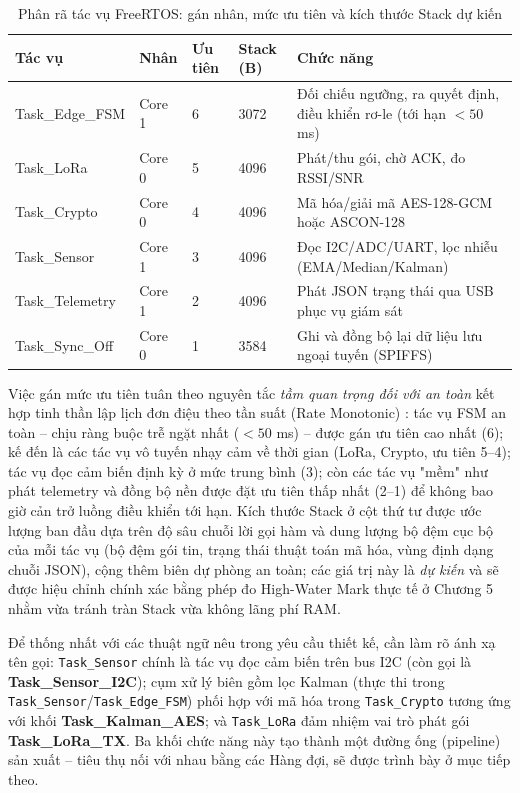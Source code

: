 \begin{table}[H]
\centering
\caption{Phân rã tác vụ FreeRTOS: gán nhân, mức ưu tiên và kích thước Stack dự kiến}
\label{Bảng 3.4}
\renewcommand{\arraystretch}{1.4}
\small
\begin{tabular}{p{2.8cm} p{1.1cm} p{1.3cm} p{1.7cm} p{6.2cm}}
\hline
\textbf{Tác vụ} & \textbf{Nhân} & \textbf{Ưu tiên} & \textbf{Stack (B)} & \textbf{Chức năng} \\ \hline
Task\_Edge\_FSM & Core 1 & 6 & 3072 & Đối chiếu ngưỡng, ra quyết định, điều khiển rơ-le (tới hạn $<50$ ms) \\ 
Task\_LoRa & Core 0 & 5 & 4096 & Phát/thu gói, chờ ACK, đo RSSI/SNR \\ 
Task\_Crypto & Core 0 & 4 & 4096 & Mã hóa/giải mã AES-128-GCM hoặc ASCON-128 \\ 
Task\_Sensor & Core 1 & 3 & 4096 & Đọc I2C/ADC/UART, lọc nhiễu (EMA/Median/Kalman) \\ 
Task\_Telemetry & Core 1 & 2 & 4096 & Phát JSON trạng thái qua USB phục vụ giám sát \\ 
Task\_Sync\_Off & Core 0 & 1 & 3584 & Ghi và đồng bộ lại dữ liệu lưu ngoại tuyến (SPIFFS) \\ \hline
\end{tabular}
\end{table}

Việc gán mức ưu tiên tuân theo nguyên tắc \textit{tầm quan trọng đối với an toàn} kết hợp tinh thần lập lịch đơn điệu theo tần suất (Rate Monotonic) \cite{liu1973scheduling}: tác vụ FSM an toàn -- chịu ràng buộc trễ ngặt nhất ($<50$ ms) -- được gán ưu tiên cao nhất (6); kế đến là các tác vụ vô tuyến nhạy cảm về thời gian (LoRa, Crypto, ưu tiên 5--4); tác vụ đọc cảm biến định kỳ ở mức trung bình (3); còn các tác vụ "mềm" như phát telemetry và đồng bộ nền được đặt ưu tiên thấp nhất (2--1) để không bao giờ cản trở luồng điều khiển tới hạn. Kích thước Stack ở cột thứ tư được ước lượng ban đầu dựa trên độ sâu chuỗi lời gọi hàm và dung lượng bộ đệm cục bộ của mỗi tác vụ (bộ đệm gói tin, trạng thái thuật toán mã hóa, vùng định dạng chuỗi JSON), cộng thêm biên dự phòng an toàn; các giá trị này là \emph{dự kiến} và sẽ được hiệu chỉnh chính xác bằng phép đo High-Water Mark thực tế ở Chương 5 nhằm vừa tránh tràn Stack vừa không lãng phí RAM.

Để thống nhất với các thuật ngữ nêu trong yêu cầu thiết kế, cần làm rõ ánh xạ tên gọi: \texttt{Task\_Sensor} chính là tác vụ đọc cảm biến trên bus I2C (còn gọi là \textbf{Task\_Sensor\_I2C}); cụm xử lý biên gồm lọc Kalman (thực thi trong \texttt{Task\_Sensor}/\texttt{Task\_Edge\_FSM}) phối hợp với mã hóa trong \texttt{Task\_Crypto} tương ứng với khối \textbf{Task\_Kalman\_AES}; và \texttt{Task\_LoRa} đảm nhiệm vai trò phát gói \textbf{Task\_LoRa\_TX}. Ba khối chức năng này tạo thành một đường ống (pipeline) sản xuất -- tiêu thụ nối với nhau bằng các Hàng đợi, sẽ được trình bày ở mục tiếp theo.

